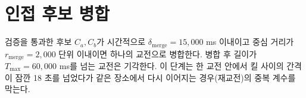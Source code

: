 
\section{인접 후보 병합}
\label{sec:loc-merge}

검증을 통과한 후보 $C_a, C_b$가 시간적으로 $\delta_{\mathrm{merge}} = 15{,}000$ ms 이내이고 중심 거리가 $r_{\mathrm{merge}} = 2{,}000$ 단위 이내이면 하나의 교전으로 병합한다. 병합 후 길이가 $T_{\max} = 60{,}000$ ms를 넘는 교전은 기각한다. 이 단계는 한 교전 안에서 킬 사이의 간격이 잠깐 18 초를 넘었다가 같은 장소에서 다시 이어지는 경우(재교전)의 중복 계수를 막는다.
